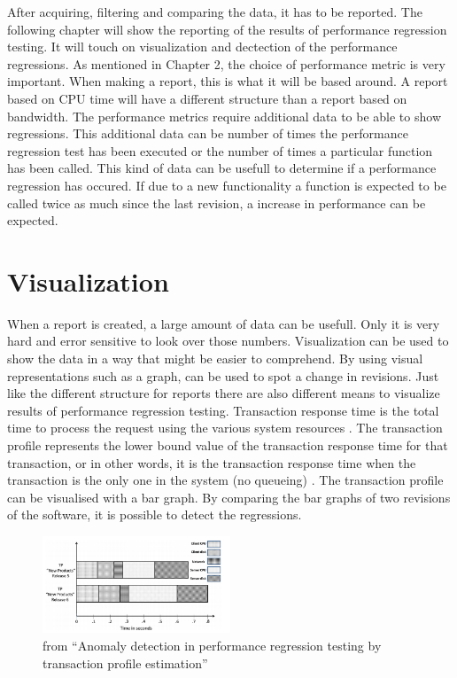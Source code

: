 After acquiring, filtering and comparing the data, it has to be reported. The following chapter will show the reporting of the results of performance regression testing. It will touch on visualization and dectection of the performance regressions. \newline
\newline
As mentioned in Chapter 2, the choice of performance metric is very important. When making a report, this is what it will be based around. A report based on CPU time will have a different structure than a report based on bandwidth. The performance metrics require additional data to be able to show regressions. This additional data can be number of times the performance regression test has been executed or the number of times a particular function has been called. This kind of data can be usefull to determine if a performance regression has occured. If due to a new functionality a function is expected to be called twice as much since the last revision, a increase in performance can be expected.\newline

\section{Visualization}
When a report is created, a large amount of data can be usefull. Only it is very hard and error sensitive to look over those numbers. Visualization can be used to show the data in a way that might be easier to comprehend. By using visual representations such as a graph, can be used to spot a change in revisions. Just like the different structure for reports there are also different means to visualize results of performance regression testing.\newline
Transaction response time is the total time to process the request using the various
system resources \cite{jain2008art}. The transaction profile represents the lower bound value of the transaction response time for that transaction, or in other words, it is the
transaction response time when the transaction is the only one in the system (no queueing) \cite{ghaith2015anomaly}.\newline
The transaction profile can be visualised with a bar graph. By comparing the bar graphs of two revisions of the software, it is possible to detect the regressions.

\begin{figure}[h]
\begin{center}
  \includegraphics[width=0.5\textwidth]{Figures/TP.png}
\end{center}
  \caption{from ``Anomaly detection in performance regression testing by transaction profile estimation''\cite{ghaith2015anomaly}}

\end{figure}

